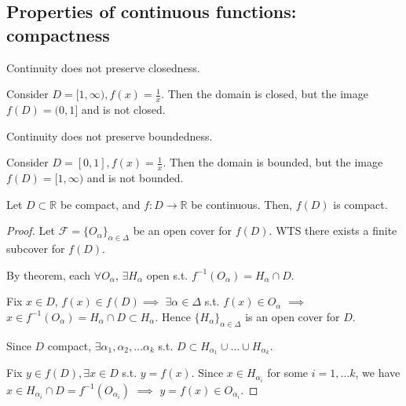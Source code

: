 
\subsection{Properties of continuous functions: compactness}

\begin{remark}
    Continuity does not preserve closedness.
\end{remark}
\begin{example}
    Consider $D = [1, \infty), f(x) = \frac{1}{x}$. Then the domain is closed,
    but the image $f(D) = (0, 1]$ and is not closed.
\end{example}
\begin{remark}
    Continuity does not preserve boundedness.
\end{remark}
\begin{example}
    Consider $D = [0, 1], f(x) = \frac{1}{x}$. 
    Then the domain is bounded,
    but the image $f(D) = [1, \infty)$ and is not bounded.
\end{example}

\begin{theorem}
    Let $D \subset \mathbb{R}$ be compact, and $f: D \to \mathbb{R}$ be continuous.
    Then, $f(D)$ is compact.
\end{theorem}

\begin{proof}
    Let $\mathcal{F} = \{ O_{\alpha} \}_{\alpha \in \Delta} $
    be an open cover for $f(D)$. WTS there exists
    a finite subcover for $f(D)$. 

    \medskip

    By theorem, each $\forall O_{\alpha}$, $\exists H_{\alpha}$
    open s.t. $f^{-1} (O_{\alpha}) = H_{\alpha} \cap D$.
    \medskip

    Fix $x \in D$, $f(x) \in f(D) \implies$
    $\exists \alpha \in \Delta$ s.t. 
    $f(x) \in O_{\alpha}$ 
    $\implies$
    $x \in f^{-1}(O_{\alpha}) = H_{\alpha} \cap D \subset H_{\alpha}$.
    Hence $ \{ H_{\alpha} \}_{\alpha \in \Delta} $ is an open cover
    for $D$.
    \medskip

    Since $D$ compact, $\exists \alpha_1, \alpha_2, \hdots \alpha_k$
    s.t. 
    $D \subset H_{\alpha_1} \cup \hdots \cup H_{\alpha_k}$.
    \medskip

    Fix $y \in f(D), \exists x \in D$ s.t. 
    $y = f(x)$. Since $x \in H_{\alpha_i}$
    for some $i = 1, \hdots k$, we have 
    $x \in H_{\alpha_i} \cap D = f^{-1}(O_{\alpha_i})$
    $\implies$
    $y = f(x) \in O_{\alpha_i}$.
\end{proof}


